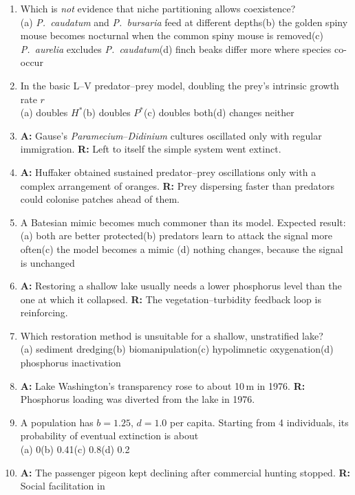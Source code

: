 \begin{enumerate}[label=\textbf{Q\arabic*.},leftmargin=2.6em]
\item Which is \emph{not} evidence that niche partitioning allows coexistence?\\
(a) \emph{P.\ caudatum} and \emph{P.\ bursaria} feed at different depths\quad (b) the golden spiny mouse becomes nocturnal
when the common spiny mouse is removed\quad (c) \emph{P.\ aurelia} excludes \emph{P.\ caudatum}\quad (d) finch beaks differ
more where species co-occur
\item In the basic L--V predator--prey model, doubling the prey's intrinsic growth rate $r$\\
(a) doubles $H^*$\quad (b) doubles $P^*$\quad (c) doubles both\quad (d) changes neither
\item \textbf{A:} Gause's \emph{Paramecium}--\emph{Didinium} cultures oscillated only with regular immigration. \textbf{R:} Left to
itself the simple system went extinct.
\item \textbf{A:} Huffaker obtained sustained predator--prey oscillations only with a complex arrangement of oranges.
\textbf{R:} Prey dispersing faster than predators could colonise patches ahead of them.
\item A Batesian mimic becomes much commoner than its model. Expected result:\\
(a) both are better protected\quad (b) predators learn to attack the signal more often\quad (c) the model becomes a mimic\quad
(d) nothing changes, because the signal is unchanged
\item \textbf{A:} Restoring a shallow lake usually needs a lower phosphorus level than the one at which it collapsed.
\textbf{R:} The vegetation--turbidity feedback loop is reinforcing.
\item Which restoration method is unsuitable for a shallow, unstratified lake?\\
(a) sediment dredging\quad (b) biomanipulation\quad (c) hypolimnetic oxygenation\quad (d) phosphorus inactivation
\item \textbf{A:} Lake Washington's transparency rose to about 10\,m in 1976. \textbf{R:} Phosphorus loading was diverted from the
lake in 1976.
\item A population has $b=1.25$, $d=1.0$ per capita. Starting from 4 individuals, its probability of eventual extinction is
about\\
(a) 0\quad (b) 0.41\quad (c) 0.8\quad (d) 0.2
\item \textbf{A:} The passenger pigeon kept declining after commercial hunting stopped. \textbf{R:} Social facilitation in

\end{enumerate}
